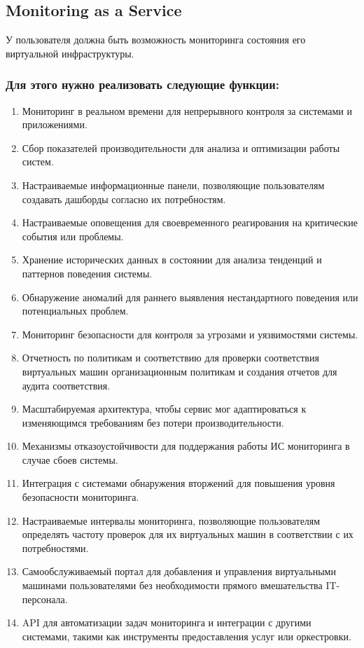 \documentclass[14pt, a4paper]{extarticle}
\begin{document}
\subsection{Monitoring as a Service}

У пользователя должна быть возможность мониторинга состояния его виртуальной инфраструктуры.

\subsubsection*{Для этого нужно реализовать следующие функции:}

\begin{enumerate}
\item Мониторинг в реальном времени для непрерывного контроля за системами и приложениями.
\item Сбор показателей производительности для анализа и оптимизации работы систем.
\item Настраиваемые информационные панели, позволяющие пользователям создавать дашборды согласно их потребностям.
\item Настраиваемые оповещения для своевременного реагирования на критические события или проблемы.
\item Хранение исторических данных в состоянии для анализа тенденций и паттернов поведения системы.
\item Обнаружение аномалий для раннего выявления нестандартного поведения или потенциальных проблем.
\item Мониторинг безопасности для контроля за угрозами и уязвимостями системы.
\item Отчетность по политикам и соответствию для проверки соответствия виртуальных машин организационным политикам и создания отчетов для аудита соответствия.
\item Масштабируемая архитектура, чтобы сервис мог адаптироваться к изменяющимся требованиям без потери производительности.
\item Механизмы отказоустойчивости для поддержания работы ИС мониторинга в случае сбоев системы.
\item Интеграция с системами обнаружения вторжений для повышения уровня безопасности мониторинга.
\item Настраиваемые интервалы мониторинга, позволяющие пользователям определять частоту проверок для их виртуальных машин в соответствии с их потребностями.
\item Самообслуживаемый портал для добавления и управления виртуальными машинами пользователями без необходимости прямого вмешательства IT-персонала.
\item API для автоматизации задач мониторинга и интеграции с другими системами, такими как инструменты предоставления услуг или оркестровки.
\end{enumerate}
\end{document}
